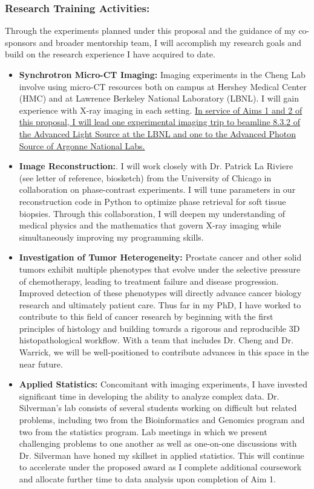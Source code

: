 \documentclass{NIHGrant}
\begin{document}
\subsubsection*{Research Training Activities:}
Through the experiments planned under this proposal and the guidance of my co-sponsors and broader mentorship team, I will accomplish my research goals and build on the research experience I have acquired to date.
\begin{itemize}[leftmargin=*, nosep]
  \item \textbf{Synchrotron Micro-CT Imaging:} Imaging experiments in the Cheng Lab involve using micro-CT resources both on campus at Hershey Medical Center (HMC) and at Lawrence Berkeley National Laboratory (LBNL). I will gain experience with X-ray imaging in each setting. \uline{In service of Aims 1 and 2 of this proposal, I will lead one experimental imaging trip to beamline 8.3.2 of the Advanced Light Source at the LBNL and one to the Advanced Photon Source of Argonne National Labs.}
  \item \textbf{Image Reconstruction:}. I will work closely with Dr. Patrick La Riviere (see letter of reference, biosketch) from the University of Chicago in collaboration on phase-contrast experiments. I will tune parameters in our reconstruction code in Python to optimize phase retrieval for soft tissue biopsies. Through this collaboration, I will deepen my understanding of medical physics and the mathematics that govern X-ray imaging while simultaneously improving my programming skills.
  \item \textbf{Investigation of Tumor Heterogeneity:} Prostate cancer and other solid tumors exhibit multiple phenotypes that evolve under the selective pressure of chemotherapy, leading to treatment failure and disease progression. Improved detection of these phenotypes will directly advance cancer biology research and ultimately patient care. Thus far in my PhD, I have worked to contribute to this field of cancer research by beginning with the first principles of histology and building towards a rigorous and reproducible 3D histopathological workflow. With a team that includes Dr. Cheng and Dr. Warrick, we will be well-positioned to contribute advances in this space in the near future.%
  \item \textbf{Applied Statistics:} Concomitant with imaging experiments, I have invested significant time in developing the ability to analyze complex data. Dr. Silverman's lab consists of several students working on difficult but related problems, including two from the Bioinformatics and Genomics program and two from the statistics program. Lab meetings in which we present challenging problems to one another as well as one-on-one discussions with Dr. Silverman have honed my skillset in applied statistics. This will continue to accelerate under the proposed award as I complete additional coursework and allocate further time to data analysis upon completion of Aim 1.

\end{itemize}
\end{document}
